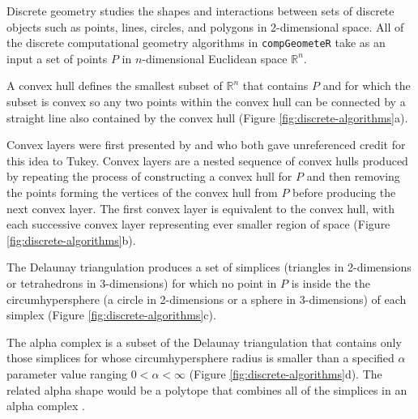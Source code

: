 \documentclass[12pt, a4paper]{article}
\begin{document}
Discrete geometry studies the shapes and interactions between sets of discrete objects such as points, lines, circles, and polygons in 2-dimensional space.  All of the discrete computational geometry algorithms in \texttt{compGeometeR} take as an input a set of points $P$ in $n$-dimensional Euclidean space $\mathbb{R}^n$.

A convex hull \citep{barber-1996} defines the smallest subset of $\mathbb{R}^n$ that contains $P$ and for which the subset is convex so any two points within the convex hull can be connected by a straight line also contained by the convex hull (Figure \ref{fig:discrete-algorithms}a).

Convex layers were first presented by \cite{huber-1972} and \cite{barnett-1976} who both gave unreferenced credit for this idea to Tukey.  Convex layers are a nested sequence of convex hulls produced by repeating the process of constructing a convex hull for $P$ and then removing the points forming the vertices of the convex hull from $P$ before producing the next convex layer.  The first convex layer is equivalent to the convex hull, with each successive convex layer representing ever smaller region of space (Figure \ref{fig:discrete-algorithms}b).

The Delaunay triangulation \citep{delaunay-1934} produces a set of simplices (triangles in 2-dimensions or tetrahedrons in 3-dimensions) for which no point in $P$ is inside the the circumhypersphere (a circle in 2-dimensions or a sphere in 3-dimensions) of each simplex (Figure \ref{fig:discrete-algorithms}c).

The alpha complex \citep{edelsbrunner-1994} is a subset of the Delaunay triangulation that contains only those simplices for whose circumhypersphere radius is smaller than a specified $\alpha$ parameter value ranging $0 < \alpha < \infty$ (Figure \ref{fig:discrete-algorithms}d).  The related alpha shape would be a polytope that combines all of the simplices in an alpha complex \citep{edelsbrunner-1994}.
\end{document}
